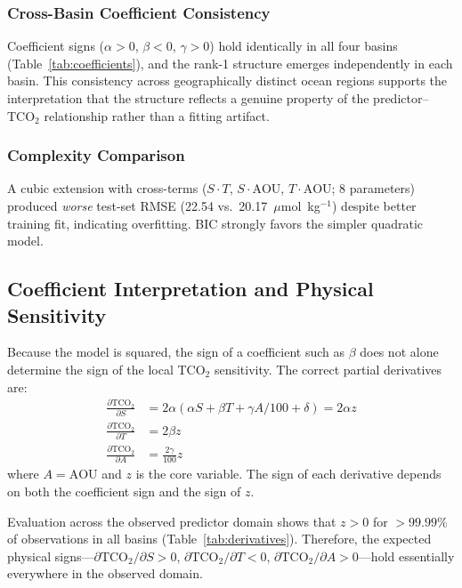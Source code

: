 \documentclass[12pt,a4paper]{article}
\begin{document}
\subsubsection{Cross-Basin Coefficient Consistency}

Coefficient signs ($\alpha > 0$, $\beta < 0$, $\gamma > 0$) hold identically in all four basins (Table~\ref{tab:coefficients}), and the rank-1 structure emerges independently in each basin. This consistency across geographically distinct ocean regions supports the interpretation that the structure reflects a genuine property of the predictor--TCO$_2$ relationship rather than a fitting artifact.

\subsubsection{Complexity Comparison}

A cubic extension with cross-terms ($S \cdot T$, $S \cdot \text{AOU}$, $T \cdot \text{AOU}$; 8 parameters) produced \emph{worse} test-set RMSE (22.54 vs.\ 20.17~$\mu$mol~kg$^{-1}$) despite better training fit, indicating overfitting. BIC strongly favors the simpler quadratic model.

\subsection{Coefficient Interpretation and Physical Sensitivity}
\label{sec:signs}

Because the model is squared, the sign of a coefficient such as $\beta$ does not alone determine the sign of the local TCO$_2$ sensitivity. The correct partial derivatives are:
\begin{align}
\frac{\partial \text{TCO}_2}{\partial S} &= 2\alpha(\alpha S + \beta T + \gamma A/100 + \delta) = 2\alpha z \label{eq:dS} \\
\frac{\partial \text{TCO}_2}{\partial T} &= 2\beta z \label{eq:dT} \\
\frac{\partial \text{TCO}_2}{\partial A} &= \frac{2\gamma}{100} z \label{eq:dA}
\end{align}
where $A = \text{AOU}$ and $z$ is the core variable. The sign of each derivative depends on both the coefficient sign and the sign of $z$.

Evaluation across the observed predictor domain shows that $z > 0$ for $>99.99\%$ of observations in all basins (Table~\ref{tab:derivatives}). Therefore, the expected physical signs---$\partial\text{TCO}_2/\partial S > 0$, $\partial\text{TCO}_2/\partial T < 0$, $\partial\text{TCO}_2/\partial A > 0$---hold essentially everywhere in the observed domain.
\end{document}
